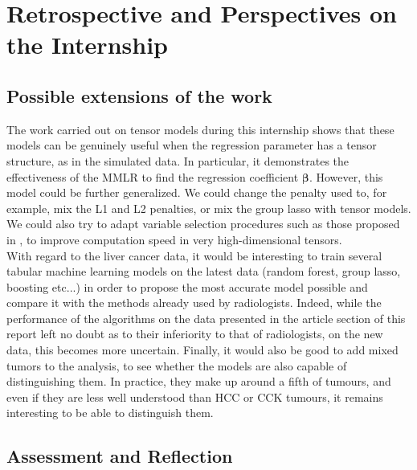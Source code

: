 \documentclass[preprint,12pt]{elsarticle}
\begin{document}
\section{Retrospective and Perspectives on the Internship}

\subsection{Possible extensions of the work}

The work carried out on tensor models during this internship shows that these models can be genuinely useful when the regression parameter has a tensor structure, as in the simulated data. In particular, it demonstrates the effectiveness of the MMLR to find the regression coefficient $\bm{\beta}$. However, this model could be further generalized. We could change the penalty used to, for example, mix the L1 and L2 penalties, or mix the group lasso with tensor models. We could also try to adapt variable selection procedures such as those proposed in \cite{sis}, to improve computation speed in very high-dimensional tensors.\\
\indent With regard to the liver cancer data, it would be interesting to train several tabular machine learning models on the latest data (random forest, group lasso, boosting etc...) in order to propose the most accurate model possible and compare it with the methods already used by radiologists. Indeed, while the performance of the algorithms on the data presented in the article section of this report left no doubt as to their inferiority to that of radiologists, on the new data, this becomes more uncertain. Finally, it would also be good to add mixed tumors to the analysis, to see whether the models are also capable of distinguishing them. In practice, they make up around a fifth of tumours, and even if they are less well understood than HCC or CCK tumours, it remains interesting to be able to distinguish them.\\

\subsection{Assessment and Reflection}
\end{document}
